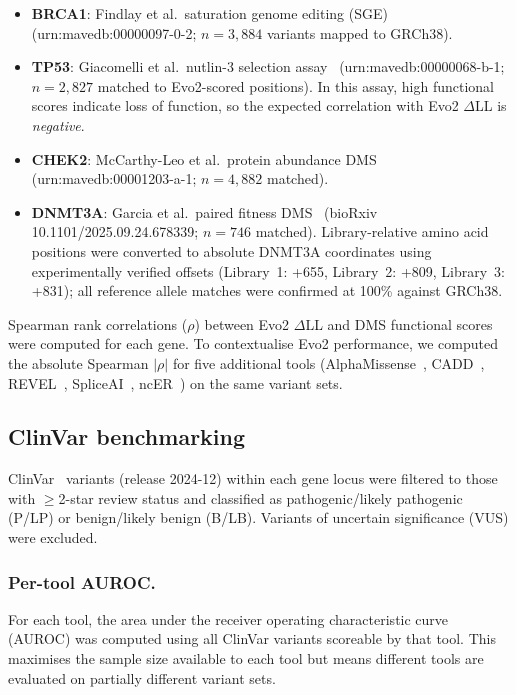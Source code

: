 \begin{itemize}
  \item \textbf{BRCA1}: Findlay et al.\ saturation genome editing
    (SGE)~\cite{BRCA1_DMS_2018} (urn:mavedb:00000097-0-2; $n = 3{,}884$
    variants mapped to GRCh38).
  \item \textbf{TP53}: Giacomelli et al.\ nutlin-3 selection
    assay~\cite{TP53_DMS_2018} (urn:mavedb:00000068-b-1; $n = 2{,}827$ matched
    to Evo2-scored positions). In this assay, high functional scores indicate
    loss of function, so the expected correlation with Evo2 $\Delta$LL is
    \textit{negative}.
  \item \textbf{CHEK2}: McCarthy-Leo et al.\ protein abundance
    DMS~\cite{CHEK2_DMS_2024} (urn:mavedb:00001203-a-1; $n = 4{,}882$ matched).
  \item \textbf{DNMT3A}: Garcia et al.\ paired fitness DMS~\cite{DNMT3A_DMS_2025}
    (bioRxiv 10.1101/2025.09.24.678339; $n = 746$ matched). Library-relative
    amino acid positions were converted to absolute DNMT3A coordinates using
    experimentally verified offsets (Library~1: +655, Library~2: +809, Library~3:
    +831); all reference allele matches were confirmed at 100\% against GRCh38.
\end{itemize}

\noindent Spearman rank correlations ($\rho$) between Evo2 $\Delta$LL and DMS
functional scores were computed for each gene. To contextualise Evo2 performance,
we computed the absolute Spearman $|\rho|$ for five additional tools
(AlphaMissense~\cite{AlphaMissense_2023}, CADD~\cite{CADD_2024},
REVEL~\cite{REVEL_2016}, SpliceAI~\cite{SpliceAI_2019}, ncER~\cite{ncER_2019})
on the same variant sets.

\subsection{ClinVar benchmarking}
\label{sec:methods_clinvar}

ClinVar~\cite{ClinVar_2018} variants (release 2024-12) within each gene locus
were filtered to those with $\geq$2-star review status and classified as
pathogenic/likely pathogenic (P/LP) or benign/likely benign (B/LB). Variants of
uncertain significance (VUS) were excluded.

\subsubsection*{Per-tool AUROC.}

For each tool, the area under the receiver operating characteristic curve
(AUROC) was computed using all ClinVar variants scoreable by that tool. This
maximises the sample size available to each tool but means different tools are
evaluated on partially different variant sets.


